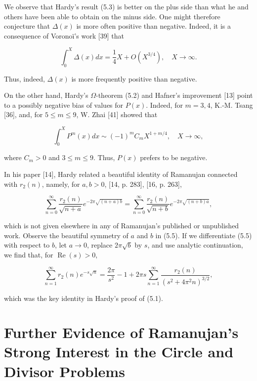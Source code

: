 \documentclass[10pt]{article}
\theoremstyle{plain}
\begin{document}
We observe that Hardy's result (5.3) is better on the plus side than what he and others have been able to obtain on the minus side. One might therefore conjecture that $\Delta(x)$ is more often positive than negative. Indeed, it is a consequence of Voronoï's work [39] that

$$
\int_{0}^{X} \Delta(x) d x=\frac{1}{4} X+O\left(X^{3 / 4}\right), \quad X \to \infty .
$$

Thus, indeed, $\Delta(x)$ is more frequently positive than negative.

On the other hand, Hardy's $\Omega$-theorem (5.2) and Hafner's improvement [13] point to a possibly negative bias of values for $P(x)$. Indeed, for $m=3,4$, K.-M. Tsang [36], and, for $5 \leq m \leq 9$, W. Zhai [41] showed that

$$
\int_{0}^{X} P^{m}(x) d x \sim(-1)^{m} C_{m} X^{1+m / 4}, \quad X \to \infty ,
$$

where $C_{m}>0$ and $3 \leq m \leq 9$. Thus, $P(x)$ prefers to be negative.

In his paper [14], Hardy related a beautiful identity of Ramanujan connected with $r_{2}(n)$, namely, for $a, b>0$, [14, p. 283], [16, p. 263],


\begin{equation*}
\sum_{n=0}^{\infty} \frac{r_{2}(n)}{\sqrt{n+a}} e^{-2 \pi \sqrt{(n+a) b}}=\sum_{n=0}^{\infty} \frac{r_{2}(n)}{\sqrt{n+b}} e^{-2 \pi \sqrt{(n+b) a}}, \tag{5.5}
\end{equation*}


which is not given elsewhere in any of Ramanujan's published or unpublished work. Observe the beautiful symmetry of $a$ and $b$ in (5.5). If we differentiate (5.5) with respect to $b$, let $a \to 0$, replace $2 \pi \sqrt{b}$ by $s$, and use analytic continuation, we find that, for $\operatorname{Re}(s)>0$,

$$
\sum_{n=1}^{\infty} r_{2}(n) e^{-s \sqrt{n}}=\frac{2 \pi}{s^{2}}-1+2 \pi s \sum_{n=1}^{\infty} \frac{r_{2}(n)}{\left(s^{2}+4 \pi^{2} n\right)^{3 / 2}},
$$

which was the key identity in Hardy's proof of (5.1).

\section{Further Evidence of Ramanujan's Strong Interest in the Circle and Divisor Problems}
\end{document}
